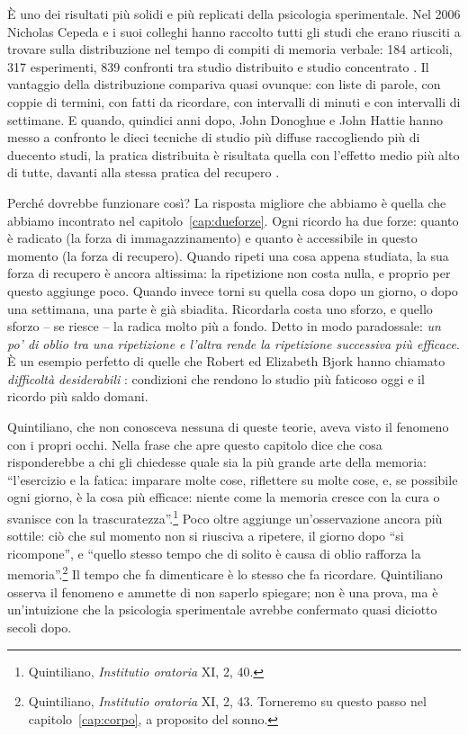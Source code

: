 È uno dei risultati più solidi e più replicati della psicologia
sperimentale. Nel 2006 Nicholas Cepeda e i suoi colleghi hanno raccolto
tutti gli studi che erano riusciti a trovare sulla distribuzione nel
tempo di compiti di memoria verbale: 184 articoli, 317 esperimenti, 839
confronti tra studio distribuito e studio concentrato
\parencite{cepeda2006}. Il vantaggio della distribuzione compariva
quasi ovunque: con liste di parole, con coppie di termini, con fatti
da ricordare, con intervalli di minuti e con intervalli di settimane. E quando, quindici
anni dopo, John Donoghue e John Hattie hanno messo a confronto le dieci
tecniche di studio più diffuse raccogliendo più di duecento studi, la
pratica distribuita è risultata quella con l'effetto medio più alto di
tutte, davanti alla stessa pratica del recupero
\parencite{donoghue2021}.

Perché dovrebbe funzionare così? La risposta migliore che abbiamo è
quella che abbiamo incontrato nel capitolo~\ref{cap:dueforze}. Ogni
ricordo ha due forze: quanto è radicato (la forza di immagazzinamento)
e quanto è accessibile in questo momento (la forza di recupero). Quando
ripeti una cosa appena studiata, la sua forza di recupero è ancora
altissima: la ripetizione non costa nulla, e proprio per questo
aggiunge poco. Quando invece torni su quella cosa dopo un giorno, o
dopo una settimana, una parte è già sbiadita. Ricordarla costa uno
sforzo, e quello sforzo -- se riesce -- la radica molto più a fondo.
Detto in modo paradossale: \emph{un po' di oblio tra una ripetizione e
l'altra rende la ripetizione successiva più efficace}. È un esempio
perfetto di quelle che Robert ed Elizabeth Bjork hanno chiamato
\emph{difficoltà desiderabili} \parencite{bjork2011}: condizioni che rendono lo studio più
faticoso oggi e il ricordo più saldo domani.

Quintiliano, che non conosceva nessuna di queste teorie, aveva visto il
fenomeno con i propri occhi. Nella frase che apre questo capitolo
dice che cosa risponderebbe a chi gli chiedesse quale sia la più
grande arte della memoria:
\enquote{l'esercizio e la fatica: imparare molte cose, riflettere su
molte cose, e, se possibile ogni giorno, è la cosa più efficace:
niente come la memoria cresce con la cura o svanisce con la
trascuratezza}.\footnote{Quintiliano, \emph{Institutio oratoria} XI,
2, 40.} Poco oltre aggiunge un'osservazione ancora più sottile: ciò che
sul momento non si riusciva a ripetere, il giorno dopo \enquote{si
ricompone}, e \enquote{quello stesso tempo che di solito è causa di
oblio rafforza la memoria}.\footnote{Quintiliano, \emph{Institutio
oratoria} XI, 2, 43. Torneremo su questo passo nel
capitolo~\ref{cap:corpo}, a proposito del sonno.} Il tempo che fa
dimenticare è lo stesso che fa ricordare. Quintiliano osserva il
fenomeno e ammette di non saperlo spiegare; non è una prova, ma è
un'intuizione che la psicologia sperimentale avrebbe confermato quasi
diciotto secoli dopo.

